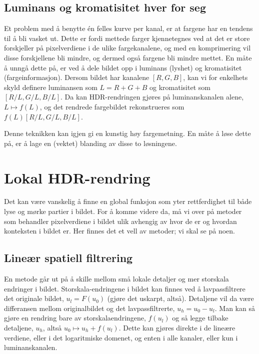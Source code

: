 \documentclass[11pt,a4paper]{article}
\begin{document}
\subsection{Luminans og kromatisitet hver for seg}
\label{sec:glob:lum_krom}

Et problem med å benytte én felles kurve per kanal, er at fargene har en tendens til å bli vasket ut. Dette er fordi mettede farger kjennetegnes ved at det er store forskjeller på pixelverdiene i de ulike fargekanalene, og med en komprimering vil disse forskjellene bli mindre, og dermed også fargene bli mindre mettet. En måte å unngå dette på, er ved å dele bildet opp i luminans (lyshet) og kromatisitet (fargeinformasjon). Dersom bildet har kanalene $[R, G, B]$, kan vi for enkelhets skyld definere luminansen som $L=R+G+B$ og kromatisitet som $[R/L, G/L, B/L]$. Da kan HDR-rendringen gjøres på luminanskanalen alene, $L \mapsto f(L)$, og det rendrede fargebildet rekonstrueres som $f(L)[R/L, G/L, B/L]$.

Denne teknikken kan igjen gi en kunstig høy fargemetning. En måte å løse dette på, er å lage en (vektet) blanding av disse to løsningene.

\section{Lokal HDR-rendring}

Det kan være vanskelig å finne en global funksjon som yter rettferdighet til både lyse og mørke partier i bildet. For å komme videre da, må vi over på metoder som behandler pixelverdiene i bildet ulik avhengig av hvor de er og hvordan konteksten i bildet er. Her finnes det et vell av metoder; vi skal se på noen.

\subsection{Lineær spatiell filtrering}
\label{sec:lok:lin}

En metode går ut på å skille mellom små lokale detaljer og mer storskala endringer i bildet. Storskala-endringene i bildet kan finnes ved å lavpassfiltrere det originale bildet, $u_l = F(u_0)$ (gjøre det uskarpt, altså). Detaljene vil da være differansen mellom originalbildet og det lavpassfiltrerte, $u_h = u_0 - u_l$. Man kan så gjøre en rendring bare av storskalaendringene, $f(u_l)$ og så legge tilbake detaljene, $u_h$, altså $u_0 \mapsto u_h + f(u_l)$. Dette kan gjøres direkte i de lineære verdiene, eller i det logaritmiske domenet, og enten i alle kanaler, eller kun i luminanskanalen.
\end{document}
